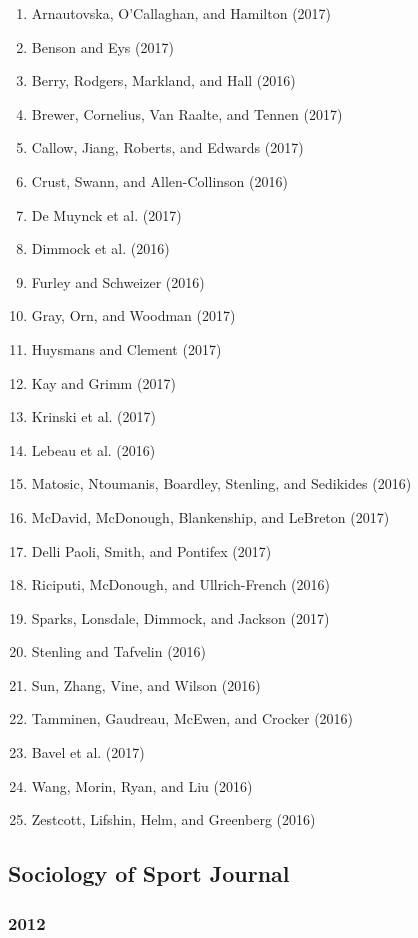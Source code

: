 \documentclass[english,man]{apa6}
\providecommand{\tightlist}{%
  \setlength{\itemsep}{0pt}\setlength{\parskip}{0pt}}
\begin{document}
\begin{enumerate}
\def\labelenumi{\arabic{enumi})}
\tightlist
\item
  Arnautovska, O'Callaghan, and Hamilton (2017)
\item
  Benson and Eys (2017)
\item
  Berry, Rodgers, Markland, and Hall (2016)
\item
  Brewer, Cornelius, Van Raalte, and Tennen (2017)
\item
  Callow, Jiang, Roberts, and Edwards (2017)
\item
  Crust, Swann, and Allen-Collinson (2016)
\item
  De Muynck et al. (2017)
\item
  Dimmock et al. (2016)
\item
  Furley and Schweizer (2016)
\item
  Gray, Orn, and Woodman (2017)
\item
  Huysmans and Clement (2017)
\item
  Kay and Grimm (2017)
\item
  Krinski et al. (2017)
\item
  Lebeau et al. (2016)
\item
  Matosic, Ntoumanis, Boardley, Stenling, and Sedikides (2016)
\item
  McDavid, McDonough, Blankenship, and LeBreton (2017)
\item
  Delli Paoli, Smith, and Pontifex (2017)
\item
  Riciputi, McDonough, and Ullrich-French (2016)
\item
  Sparks, Lonsdale, Dimmock, and Jackson (2017)
\item
  Stenling and Tafvelin (2016)
\item
  Sun, Zhang, Vine, and Wilson (2016)
\item
  Tamminen, Gaudreau, McEwen, and Crocker (2016)
\item
  Bavel et al. (2017)
\item
  Wang, Morin, Ryan, and Liu (2016)
\item
  Zestcott, Lifshin, Helm, and Greenberg (2016)
\end{enumerate}

\subsection{Sociology of Sport
Journal}\label{sociology-of-sport-journal}

\subsubsection{2012}\label{section-52}
\end{document}
